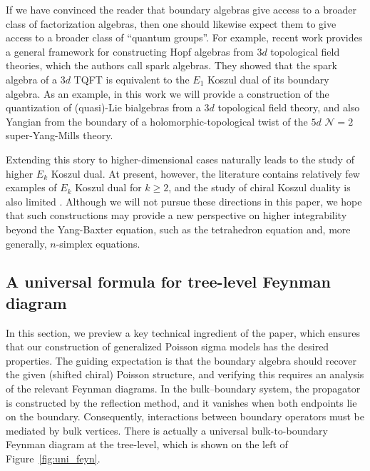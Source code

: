 \documentclass[11pt]{article}
\numberwithin{equation}{section}
\begin{document}
If we have convinced the reader that boundary algebras give access to a broader class of factorization algebras, then one should likewise expect them to give access to a broader class of “quantum groups”. For example, recent work \cite{Dimofte:2024bwe} provides a general framework for constructing Hopf algebras from $3d$ topological field theories, which the authors call spark algebras. They showed that the spark algebra of a $3d$ TQFT is equivalent to the $E_1$ Koszul dual of its boundary algebra. As an example, in this work we will provide a construction of the quantization of (quasi)-Lie bialgebras from a $3d$ topological field theory, and also Yangian from the boundary of a holomorphic-topological twist of the $5d$ $\mathcal{N} = 2$ super-Yang-Mills theory.

Extending this story to higher-dimensional cases naturally leads to the study of higher $E_k$ Koszul dual. At present, however, the literature contains relatively few examples of $E_k$ Koszul dual for $k\ge 2$, and the study of chiral Koszul duality is also limited \cite{Gui:2022pnx}. Although we will not pursue these directions in this paper, we hope that such constructions may provide a new perspective on higher integrability beyond the Yang-Baxter equation, such as the tetrahedron equation and, more generally, $n$-simplex equations.


	
		

	\subsection{A universal formula for tree-level Feynman diagram}
In this section, we preview a key technical ingredient of the paper, which ensures that our construction of generalized Poisson sigma models has the desired properties. The guiding expectation is that the boundary algebra should recover the given (shifted chiral) Poisson structure, and verifying this requires an analysis of the relevant Feynman diagrams. In the bulk--boundary system, the propagator is constructed by the reflection method, and it vanishes when both endpoints lie on the boundary. Consequently, interactions between boundary operators must be mediated by bulk vertices. There is actually a universal bulk-to-boundary Feynman diagram at the tree-level, which is shown on the left of Figure~\ref{fig:uni_feyn}.
	
\end{document}
